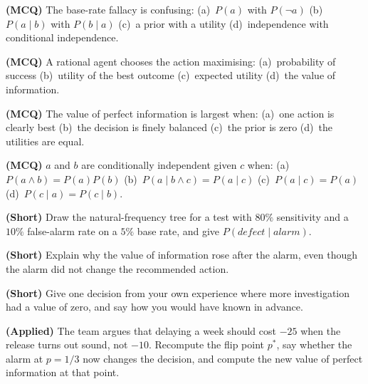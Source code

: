 \begin{reviewq}
  \item \textbf{(MCQ)} The base-rate fallacy is confusing:
        (a)~$P(a)$ with $P(\neg a)$ (b)~$P(a \mid b)$ with $P(b \mid a)$
        (c)~a prior with a utility (d)~independence with conditional independence.
  \item \textbf{(MCQ)} A rational agent chooses the action maximising:
        (a)~probability of success (b)~utility of the best outcome
        (c)~expected utility (d)~the value of information.
  \item \textbf{(MCQ)} The value of perfect information is largest when:
        (a)~one action is clearly best (b)~the decision is finely balanced
        (c)~the prior is zero (d)~the utilities are equal.
  \item \textbf{(MCQ)} $a$ and $b$ are conditionally independent given $c$ when:
        (a)~$P(a \wedge b) = P(a)P(b)$ (b)~$P(a \mid b \wedge c) = P(a \mid c)$
        (c)~$P(a \mid c) = P(a)$ (d)~$P(c \mid a) = P(c \mid b)$.
  \item \textbf{(Short)} Draw the natural-frequency tree for a test with $80\%$
        sensitivity and a $10\%$ false-alarm rate on a $5\%$ base rate, and give
        $P(\mathit{defect} \mid \mathit{alarm})$.
  \item \textbf{(Short)} Explain why the value of information rose after the alarm,
        even though the alarm did not change the recommended action.
  \item \textbf{(Short)} Give one decision from your own experience where more
        investigation had a value of zero, and say how you would have known in
        advance.
  \item \textbf{(Applied)} The team argues that delaying a week should cost $-25$
        when the release turns out sound, not $-10$. Recompute the flip point
        $p^{*}$, say whether the alarm at $p = 1/3$ now changes the decision, and
        compute the new value of perfect information at that point.
\end{reviewq}
